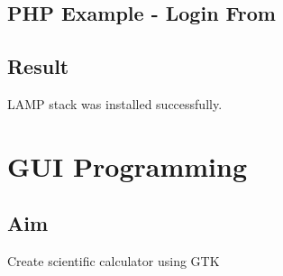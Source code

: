 \documentclass{article}
\begin{document}
\subsection {PHP Example - Login From}


\subsection{Result}
LAMP stack was installed successfully.

\newpage
\section{GUI Programming}

\subsection{Aim}
 Create scientific calculator using GTK
 
 
 
 










	
\end{document}
